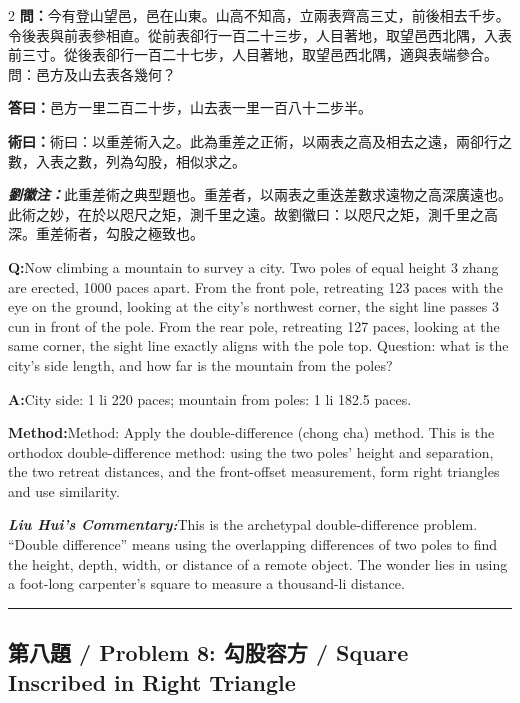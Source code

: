 \documentclass[11pt,a4paper]{article}
\newcommand{\cnwen}{\textcolor{cnlabelfg}{\textbf{問：}}}
\newcommand{\cnda}{\textbf{答曰：}}
\newcommand{\cnshu}{\textcolor{cnlabelfg}{\textbf{術曰：}}}
\newcommand{\cnzhu}{\textcolor{commentarycolor}{\textit{\textbf{劉徽注：}}}}
\newcommand{\enwen}{\textcolor{enlabelfg}{\textbf{Q:}}}
\newcommand{\enda}{\textcolor{enlabelfg}{\textbf{A:}}}
\newcommand{\enshu}{\textcolor{enlabelfg}{\textbf{Method:}}}
\newcommand{\enzhu}{\textcolor{enlabelfg}{\textit{\textbf{Liu Hui's Commentary:}}}}
\begin{document}
\begin{paracol}{2}
\switchcolumn[0]
\cnwen 今有登山望邑，邑在山東。山高不知高，立兩表齊高三丈，前後相去千步。令後表與前表參相直。從前表卻行一百二十三步，人目著地，取望邑西北隅，入表前三寸。從後表卻行一百二十七步，人目著地，取望邑西北隅，適與表端參合。問：邑方及山去表各幾何？

\cnda 邑方一里二百二十步，山去表一里一百八十二步半。

\cnshu 術曰：以重差術入之。此為重差之正術，以兩表之高及相去之遠，兩卻行之數，入表之數，列為勾股，相似求之。

\cnzhu 此重差術之典型題也。重差者，以兩表之重迭差數求遠物之高深廣遠也。此術之妙，在於以咫尺之矩，測千里之遠。故劉徽曰：以咫尺之矩，測千里之高深。重差術者，勾股之極致也。

\switchcolumn[1]
\enwen Now climbing a mountain to survey a city. Two poles of equal height 3 zhang are erected, 1000 paces apart. From the front pole, retreating 123 paces with the eye on the ground, looking at the city's northwest corner, the sight line passes 3 cun in front of the pole. From the rear pole, retreating 127 paces, looking at the same corner, the sight line exactly aligns with the pole top. Question: what is the city's side length, and how far is the mountain from the poles?

\enda City side: 1 li 220 paces; mountain from poles: 1 li 182.5 paces.

\enshu Method: Apply the double-difference (chong cha) method. This is the orthodox double-difference method: using the two poles' height and separation, the two retreat distances, and the front-offset measurement, form right triangles and use similarity.

\enzhu This is the archetypal double-difference problem. ``Double difference'' means using the overlapping differences of two poles to find the height, depth, width, or distance of a remote object. The wonder lies in using a foot-long carpenter's square to measure a thousand-li distance.
\end{paracol}

\bigskip\hrule\bigskip

\subsection{第八題 / Problem 8: 勾股容方 / Square Inscribed in Right Triangle}
\end{document}
